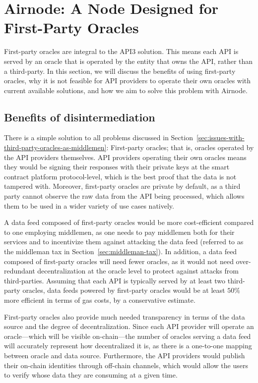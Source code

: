 \documentclass[11pt]{article}
\begin{document}
\section{Airnode: A Node Designed for First-Party Oracles}
\label{sec:airnode-a-node-designed-for-first-party-oracles}

First-party oracles are integral to the API3 solution.
This means each API is served by an oracle that is operated by the entity that owns the API, rather than a third-party.
In this section, we will discuss the benefits of using first-party oracles, why it is not feasible for API providers to operate their own oracles with current available solutions, and how we aim to solve this problem with Airnode.

\subsection{Benefits of disintermediation}
\label{sec:benefits-of-disintermediation}

There is a simple solution to all problems discussed in Section~\ref{sec:issues-with-third-party-oracles-as-middlemen}: First-party oracles; that is, oracles operated by the API providers themselves.
API providers operating their own oracles means they would be signing their responses with their private keys at the smart contract platform protocol-level, which is the best proof that the data is not tampered with.
Moreover, first-party oracles are private by default, as a third party cannot observe the raw data from the API being processed, which allows them to be used in a wider variety of use cases natively.

A data feed composed of first-party oracles would be more cost-efficient compared to one employing middlemen, as one needs to pay middlemen both for their services and to incentivize them against attacking the data feed (referred to as the middleman tax in Section~\ref{sec:middleman-tax}).
In addition, a data feed composed of first-party oracles will need fewer oracles, as it would not need over-redundant decentralization at the oracle level to protect against attacks from third-parties.
Assuming that each API is typically served by at least two third-party oracles, data feeds powered by first-party oracles would be at least $50\%$ more efficient in terms of gas costs, by a conservative estimate.

First-party oracles also provide much needed transparency in terms of the data source and the degree of decentralization.
Since each API provider will operate an oracle---which will be visible on-chain---the number of oracles serving a data feed will accurately represent how decentralized it is, as there is a one-to-one mapping between oracle and data source.
Furthermore, the API providers would publish their on-chain identities through off-chain channels, which would allow the users to verify whose data they are consuming at a given time.
\end{document}
